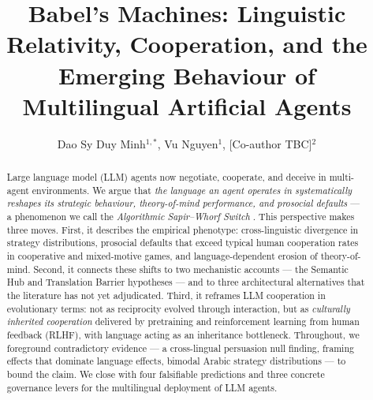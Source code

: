 \documentclass[openacc]{rsproca_new}
\begin{document}
\title{Babel's Machines: Linguistic Relativity, Cooperation, and the Emerging Behaviour of Multilingual Artificial Agents}

\author{%
Dao Sy Duy Minh$^{1,*}$,
Vu Nguyen$^{1}$,
[Co-author TBC]$^{2}$}

\address{%
$^{1}$Faculty of Information Technology, University of Science, Vietnam National University, Ho Chi Minh City, Vietnam\\
$^{2}$[Affiliation pending]}

\subject{artificial intelligence, behavioural science, evolutionary game theory}



\begin{abstract}
Large language model (LLM) agents now negotiate, cooperate, and deceive in multi-agent environments. We argue that \emph{the language an agent operates in systematically reshapes its strategic behaviour, theory-of-mind performance, and prosocial defaults} --- a phenomenon we call the \emph{Algorithmic Sapir--Whorf Switch} \cite{wang2025babel}. This perspective makes three moves. First, it describes the empirical phenotype: cross-linguistic divergence in strategy distributions, prosocial defaults that exceed typical human cooperation rates in cooperative and mixed-motive games, and language-dependent erosion of theory-of-mind. Second, it connects these shifts to two mechanistic accounts --- the Semantic Hub and Translation Barrier hypotheses --- and to three architectural alternatives that the literature has not yet adjudicated. Third, it reframes LLM cooperation in evolutionary terms: not as reciprocity evolved through interaction, but as \emph{culturally inherited cooperation} delivered by pretraining and reinforcement learning from human feedback (RLHF), with language acting as an inheritance bottleneck. Throughout, we foreground contradictory evidence --- a cross-lingual persuasion null finding, framing effects that dominate language effects, bimodal Arabic strategy distributions --- to bound the claim. We close with four falsifiable predictions and three concrete governance levers for the multilingual deployment of LLM agents.
\end{abstract}

\begin{fmtext}
\end{fmtext}
\end{document}
